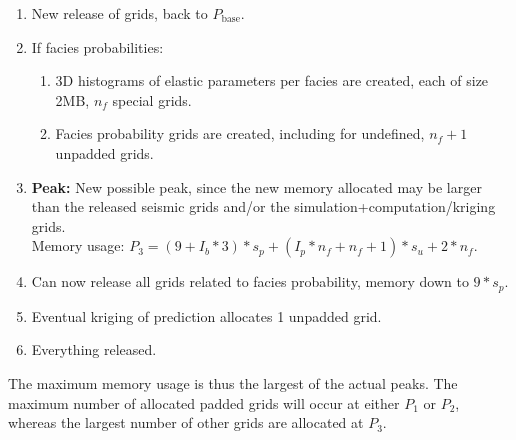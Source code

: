 \begin{enumerate}
\item New release of grids, back to $P_\text{base}$.
\item If facies probabilities:
\begin{enumerate}
\item 3D histograms of elastic parameters per facies are created, each
  of size 2MB, $n_f$ special grids.
\item Facies probability grids are created, including for undefined,
  $n_f+1$ unpadded grids.
\end{enumerate}
\item {\bf Peak:} New possible peak, since the new memory allocated
  may be larger than the released seismic grids and/or the
  simulation+computation/kriging grids. \\
    Memory usage: $P_3 = (9+I_b*3)*s_p+(I_p*n_f + n_f +1)*s_u + 2*n_f$.
\item Can now release all grids related to facies probability, memory down to $9*s_p$.
\item Eventual kriging of prediction allocates 1 unpadded grid.
\item Everything released.
\end{enumerate}

The maximum memory usage is thus the largest of the actual peaks. The
maximum number of allocated padded grids will occur at either $P_1$ or
$P_2$, whereas the largest number of other grids are allocated at
$P_3$.
